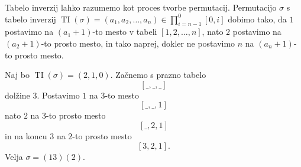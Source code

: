 \documentclass[mat2, tisk]{fmfdelo}
\begin{document}
Tabelo inverzij lahko razumemo kot proces tvorbe
permutacij. Permutacijo $\sigma$ s tabelo inverzij
$\operatorname{TI}(\sigma) = (a_1, a_2, \dotsc, a_n) \in
\prod_{i=n-1}^0 [0, i]$ dobimo tako, da
$1$ postavimo na $(a_1 + 1)$-to mesto v tabeli $[1,2,\dotsc, n]$,
nato $2$ postavimo na $(a_2 + 1)$-to prosto mesto,
in tako naprej, dokler ne postavimo $n$ na $(a_n + 1)$-to
prosto mesto.
\begin{primer}
  \label{primer:tabela_inverzij}
  Naj bo  $\operatorname{TI}(\sigma) = (2, 1, 0)$.
  Začnemo s prazno tabelo
  $$[ \_, \_, \_]$$
  dolžine $3$. Postavimo $1$ na $3$-to mesto
  $$[ \_, \_, 1]$$
  nato $2$ na $3$-to prosto mesto
  $$[ \_, 2, 1]$$
  in na koncu $3$ na $2$-to prosto mesto
  $$[ 3, 2, 1].$$
  Velja $\sigma = (13)(2)$.
\end{primer}
\end{document}

